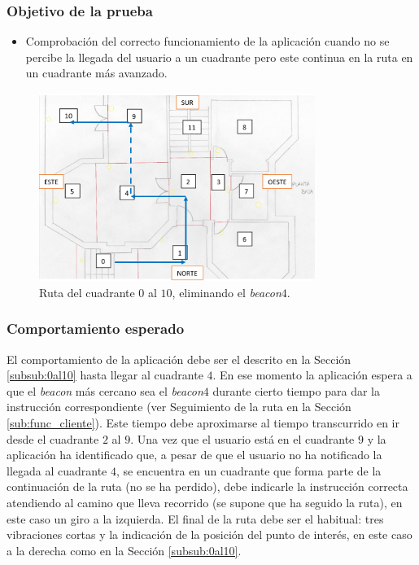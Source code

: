 \subsubsection*{Objetivo de la prueba}

\begin{itemize}
	\item Comprobación del correcto funcionamiento de la aplicación cuando no se percibe la llegada del usuario a un cuadrante pero este continua en la ruta en un cuadrante más avanzado.
\end{itemize}


\begin{figure}[t]
	\centering
	\includegraphics[width=0.8\textwidth]{Imagenes/Evaluacion/del0al10sin4}
	\caption{Ruta del cuadrante $0$ al $10$, eliminando el \textit{beacon$4$}.}
	\label{fig:del0al10sin4}
\end{figure}

\subsubsection*{Comportamiento esperado}

El comportamiento de la aplicación debe ser el descrito en la Sección \ref{subsub:0al10} hasta llegar al cuadrante $4$. En ese momento la aplicación espera a que el \textit{beacon} más cercano sea el \textit{beacon$4$} durante cierto tiempo para dar la instrucción correspondiente (ver Seguimiento de la ruta en la Sección \ref{sub:func_cliente}). Este tiempo debe aproximarse al tiempo transcurrido en ir desde el cuadrante $2$ al $9$. Una vez que el usuario está en el cuadrante $9$ y la aplicación ha identificado que, a pesar de que el usuario no ha notificado la llegada al cuadrante $4$, se encuentra en un cuadrante que forma parte de la continuación de la ruta (no se ha perdido), debe indicarle la instrucción correcta atendiendo al camino que lleva recorrido (se supone que ha seguido la ruta), en este caso un giro a la izquierda. El final de la ruta debe ser el habitual: tres vibraciones cortas y la indicación de la posición del punto de interés, en este caso a la derecha como en la Sección \ref{subsub:0al10}.


